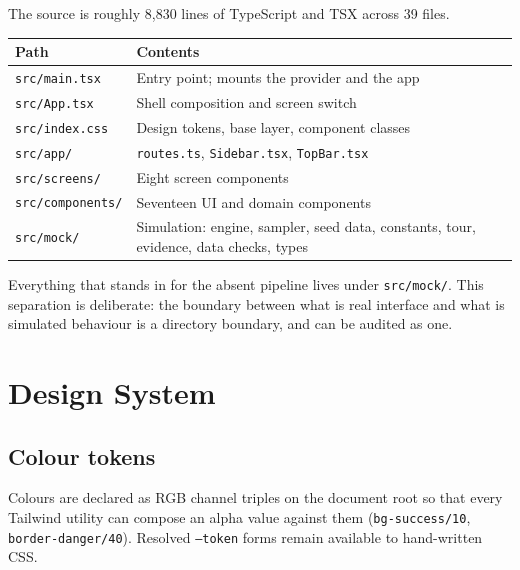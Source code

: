 \documentclass[11pt,a4paper]{report}
\newcommand{\code}[1]{\texttt{\small #1}}
\begin{document}
The source is roughly 8{,}830 lines of TypeScript and TSX across 39 files.

\begin{longtable}{L{5.4cm} L{9.4cm}}
\toprule
\textbf{Path} & \textbf{Contents} \\
\midrule
\endhead
\code{src/main.tsx} & Entry point; mounts the provider and the app \\
\code{src/App.tsx} & Shell composition and screen switch \\
\code{src/index.css} & Design tokens, base layer, component classes \\
\code{src/app/} & \code{routes.ts}, \code{Sidebar.tsx}, \code{TopBar.tsx} \\
\code{src/screens/} & Eight screen components \\
\code{src/components/} & Seventeen UI and domain components \\
\code{src/mock/} & Simulation: engine, sampler, seed data, constants, tour, evidence, data checks, types \\
\bottomrule
\end{longtable}

Everything that stands in for the absent pipeline lives under
\code{src/mock/}. This separation is deliberate: the boundary between what is
real interface and what is simulated behaviour is a directory boundary, and can
be audited as one.

\chapter{Design System}

\section{Colour tokens}

Colours are declared as RGB channel triples on the document root so that every
Tailwind utility can compose an alpha value against them
(\code{bg-success/10}, \code{border-danger/40}). Resolved \code{--token} forms
remain available to hand-written CSS.
\end{document}
